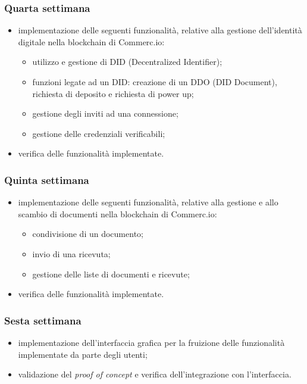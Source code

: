 {    \subsubsection{Quarta settimana} 
    \begin{itemize}
        \item implementazione delle seguenti funzionalità, relative alla gestione dell'identità digitale nella blockchain di Commerc.io:
        \begin{itemize}
        	\item utilizzo e gestione di DID (Decentralized Identifier);
        	\item funzioni legate ad un DID: creazione di un DDO (DID Document), richiesta di deposito e richiesta di power up;
        	\item gestione degli inviti ad una connessione;
        	\item gestione delle credenziali verificabili;
        \end{itemize}
    	\item verifica delle funzionalità implementate.
    \end{itemize}

    \subsubsection{Quinta settimana} 
    \begin{itemize}
        \item implementazione delle seguenti funzionalità, relative alla gestione e allo scambio di documenti nella blockchain di Commerc.io:
        \begin{itemize}
        	\item condivisione di un documento;
        	\item invio di una ricevuta;
        	\item gestione delle liste di documenti e ricevute;
        \end{itemize}
   		\item verifica delle funzionalità implementate.
    \end{itemize}

    \subsubsection{Sesta settimana} 
    \begin{itemize}
        \item implementazione dell'interfaccia grafica per la fruizione delle funzionalità implementate da parte degli utenti;
        \item validazione del \textit{proof of concept} e verifica dell'integrazione con l'interfaccia.
    \end{itemize}

}
